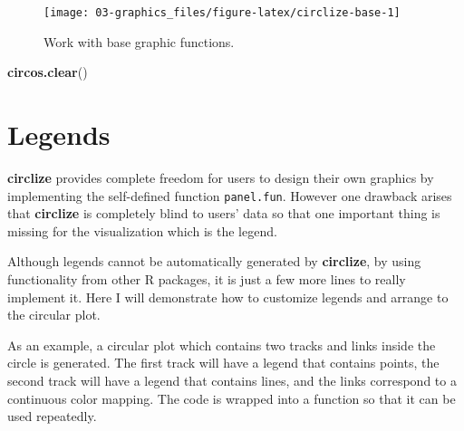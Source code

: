 \documentclass[]{book}
\newenvironment{Shaded}{\begin{snugshade}}{\end{snugshade}}
\newcommand{\KeywordTok}[1]{\textcolor[rgb]{0.13,0.29,0.53}{\textbf{#1}}}
\newcommand{\NormalTok}[1]{#1}
\theoremstyle{definition}
\theoremstyle{definition}
\theoremstyle{remark}
\begin{document}
\begin{figure}

{\centering \texttt{[image: 03-graphics\_files/figure-latex/circlize-base-1]} 

}

\caption{Work with base graphic functions.}\label{fig:circlize-base}
\end{figure}

\begin{Shaded}
\begin{Highlighting}[]
\KeywordTok{circos.clear}\NormalTok{()}
\end{Highlighting}
\end{Shaded}

\chapter{Legends}\label{legends}

\textbf{circlize} provides complete freedom for users to design their
own graphics by implementing the self-defined function
\texttt{panel.fun}. However one drawback arises that \textbf{circlize}
is completely blind to users' data so that one important thing is
missing for the visualization which is the legend.

Although legends cannot be automatically generated by \textbf{circlize},
by using functionality from other R packages, it is just a few more
lines to really implement it. Here I will demonstrate how to customize
legends and arrange to the circular plot.

As an example, a circular plot which contains two tracks and links
inside the circle is generated. The first track will have a legend that
contains points, the second track will have a legend that contains
lines, and the links correspond to a continuous color mapping. The code
is wrapped into a function so that it can be used repeatedly.
\end{document}

